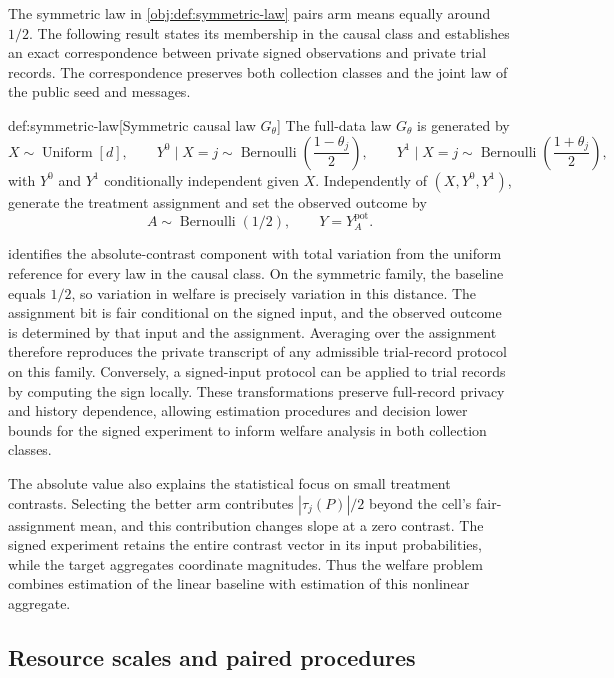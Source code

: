 \documentclass[11pt]{article}
\begin{document}
The symmetric law  in \cref{obj:def:symmetric-law} pairs arm means equally around \(1/2\). The following result states its membership in the causal class and establishes an exact correspondence between private signed observations and private trial records. The correspondence preserves both collection classes and the joint law of the public seed and messages.

\begin{definitionv}{def:symmetric-law}[Symmetric causal law $G_\theta$]
The full-data law \(G_\theta\) is generated by
\[
X\sim\operatorname{Uniform}[d],
\qquad
Y^0\mid X=j\sim\operatorname{Bernoulli}\!\left(\frac{1-\theta_j}{2}\right),
\qquad
Y^1\mid X=j\sim\operatorname{Bernoulli}\!\left(\frac{1+\theta_j}{2}\right),
\]
with \(Y^0\) and \(Y^1\) conditionally independent given \(X\). Independently of \((X,Y^0,Y^1)\), generate the treatment assignment and set the observed outcome by
\[
A\sim\operatorname{Bernoulli}(1/2),
\qquad
Y=Y^{\mathrm{pot}}_A.
\]
\end{definitionv}

 identifies the absolute-contrast component with total variation from the uniform reference for every law in the causal class. On the symmetric family, the baseline equals \(1/2\), so variation in welfare is precisely variation in this distance. The assignment bit is fair conditional on the signed input, and the observed outcome is determined by that input and the assignment. Averaging over the assignment therefore reproduces the private transcript of any admissible trial-record protocol on this family. Conversely, a signed-input protocol can be applied to trial records by computing the sign locally. These transformations preserve full-record privacy and history dependence, allowing estimation procedures and decision lower bounds for the signed experiment to inform welfare analysis in both collection classes.

The absolute value also explains the statistical focus on small treatment contrasts. Selecting the better arm contributes \(|\tau_j(P)|/2\) beyond the cell's fair-assignment mean, and this contribution changes slope at a zero contrast. The signed experiment retains the entire contrast vector in its input probabilities, while the target aggregates coordinate magnitudes. Thus the welfare problem combines estimation of the linear baseline with estimation of this nonlinear aggregate.

\subsection{Resource scales and paired procedures}
\end{document}
